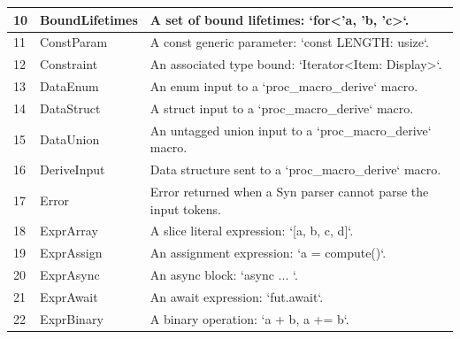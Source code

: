 \begin{longtable}{| p{} | p{} | p{} |}
10    & BoundLifetimes                 & A set of bound lifetimes: `for<'a, 'b, 'c>`.                                                                   \\ \hline
11    & ConstParam                     & A const generic parameter: `const LENGTH: usize`.                                                              \\ \hline
12    & Constraint                     & An associated type bound: `Iterator<Item: Display>`.                                                           \\ \hline
13    & DataEnum                       & An enum input to a `proc\_macro\_derive` macro.                                                                  \\ \hline
14    & DataStruct                     & A struct input to a `proc\_macro\_derive` macro.                                                                 \\ \hline
15    & DataUnion                      & An untagged union input to a `proc\_macro\_derive` macro.                                                        \\ \hline
16    & DeriveInput                    & Data structure sent to a `proc\_macro\_derive` macro.                                                            \\ \hline
17    & Error                          & Error returned when a Syn parser cannot parse the input tokens.                                                \\ \hline
18    & ExprArray                      & A slice literal expression: `[a, b, c, d]`.                                                                    \\ \hline
19    & ExprAssign                     & An assignment expression: `a = compute()`.                                                                     \\ \hline
20    & ExprAsync                      & An async block: `async { ... }`.                                                                               \\ \hline
21    & ExprAwait                      & An await expression: `fut.await`.                                                                              \\ \hline
22    & ExprBinary                     & A binary operation: `a + b, a += b`.                                                                           \\ \hline

\end{longtable}
